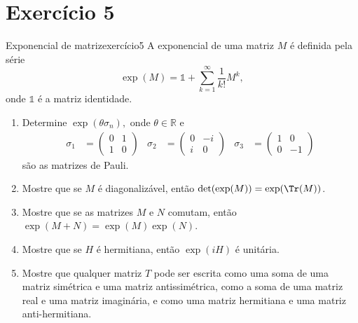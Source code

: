 \section*{Exercício 5}
\begin{exercício}{Exponencial de matriz}{exercício5}
    A exponencial de uma matriz \(M\) é definida pela série
    \begin{equation*}
        \exp(M) = \mathds{1} + \sum_{k = 1}^{\infty} \frac{1}{k!} M^{k},
    \end{equation*}
    onde \(\mathds{1}\) é a matriz identidade.
    \begin{enumerate}[label=(\alph*)]
        \item Determine \(\exp(\theta \sigma_n),\) onde \(\theta \in \mathbb{R}\) e
            \begin{align*}
                \sigma_1 &= \begin{pmatrix}
                    0 & 1\\
                    1 & 0
                \end{pmatrix}&
                \sigma_2 &= \begin{pmatrix}
                    0 & -i\\
                    i & 0
                \end{pmatrix}&
                \sigma_3 &= \begin{pmatrix}
                    1 & 0\\
                    0 & -1
                \end{pmatrix}
            \end{align*}
            são as matrizes de Pauli.
        \item Mostre que se \(M\) é diagonalizável, então \(\det(\exp(M)) = \exp(\Tr(M))\).
        \item Mostre que se as matrizes \(M\) e \(N\) comutam, então \(\exp(M+N) = \exp(M)\exp(N)\).
        \item Mostre que se \(H\) é hermitiana, então \(\exp(iH)\) é unitária.
        \item Mostre que qualquer matriz \(T\) pode ser escrita como uma soma de uma matriz simétrica e uma matriz antissimétrica, como a soma de uma matriz real e uma matriz imaginária, e como uma matriz hermitiana e uma matriz anti-hermitiana.
    \end{enumerate}
\end{exercício}
